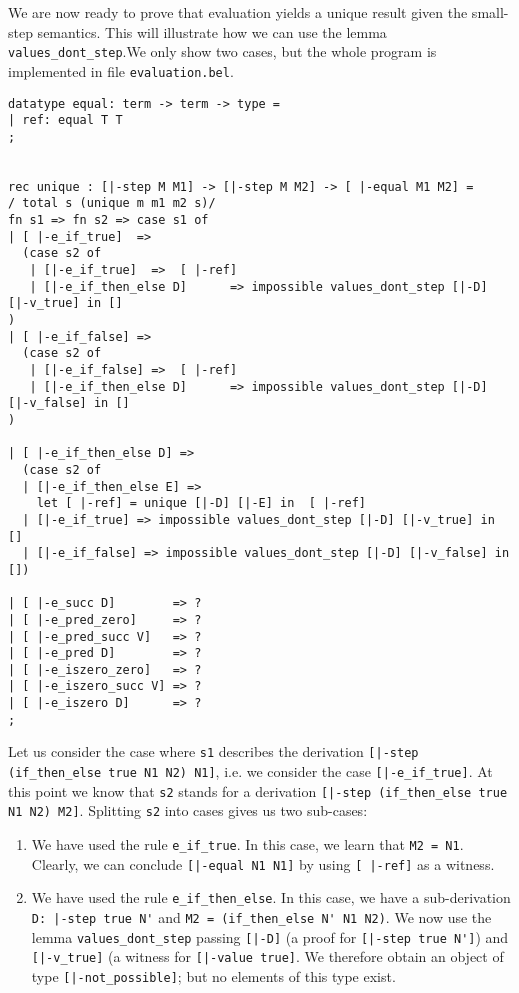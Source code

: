 We are now ready to prove that evaluation yields a unique result given the
small-step semantics. This will illustrate how we can use the lemma \lstinline!values_dont_step!.We only show two cases, but the whole program is
implemented in file \lstinline!evaluation.bel!.

\begin{lstlisting}
datatype equal: term -> term -> type =
| ref: equal T T
;


rec unique : [|-step M M1] -> [|-step M M2] -> [ |-equal M1 M2] =
/ total s (unique m m1 m2 s)/
fn s1 => fn s2 => case s1 of
| [ |-e_if_true]  =>
  (case s2 of
   | [|-e_if_true]  =>  [ |-ref]
   | [|-e_if_then_else D]      => impossible values_dont_step [|-D] [|-v_true] in []
)
| [ |-e_if_false] =>
  (case s2 of
   | [|-e_if_false] =>  [ |-ref]
   | [|-e_if_then_else D]      => impossible values_dont_step [|-D] [|-v_false] in []
)

| [ |-e_if_then_else D] =>
  (case s2 of
  | [|-e_if_then_else E] =>
    let [ |-ref] = unique [|-D] [|-E] in  [ |-ref]
  | [|-e_if_true] => impossible values_dont_step [|-D] [|-v_true] in []
  | [|-e_if_false] => impossible values_dont_step [|-D] [|-v_false] in [])

| [ |-e_succ D]        => ?
| [ |-e_pred_zero]     => ?
| [ |-e_pred_succ V]   => ?
| [ |-e_pred D]        => ?
| [ |-e_iszero_zero]   => ?
| [ |-e_iszero_succ V] => ?
| [ |-e_iszero D]      => ?
;
\end{lstlisting}

Let us consider the case where \lstinline!s1! describes the derivation
\lstinline![|-step (if_then_else true N1 N2) N1]!, i.e. we consider the case
\lstinline![|-e_if_true]!. At this point we know that \lstinline!s2! stands
for a derivation \lstinline![|-step (if_then_else true N1 N2) M2]!. Splitting
\lstinline!s2! into cases gives us two sub-cases:
\begin{enumerate}
\item We have used the rule
\lstinline!e_if_true!. In this case, we learn that
\lstinline!M2 = N1!. Clearly, we can conclude \lstinline![|-equal N1 N1]! by
using \lstinline![ |-ref]! as a witness.

\item We have used the rule \lstinline!e_if_then_else!. In this case, we have a
  sub-derivation \lstinline!D: |-step true N'! and \lstinline!M2 = (if_then_else N' N1 N2)!.
We now use the lemma \lstinline!values_dont_step! passing \lstinline![|-D]! (a
proof for \lstinline![|-step true N']!) and \lstinline![|-v_true]! (a witness
for \lstinline![|-value true]!.
We therefore obtain an object of type \lstinline![|-not_possible]!; but no
elements of this type exist.
\end{enumerate}

